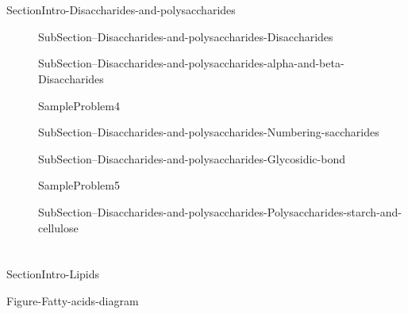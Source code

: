 \documentclass[main.tex]{subfiles}
\begin{document}
\section{\color{blue!30!black}{Disaccharides and polysaccharides}}
  {SectionIntro-Disaccharides-and-polysaccharides}



\sloppy\begin{description}

\item[] {SubSection--Disaccharides-and-polysaccharides-Disaccharides}


\item[] {SubSection--Disaccharides-and-polysaccharides-alpha-and-beta-Disaccharides}




  {SampleProblem4}



\item[] {SubSection--Disaccharides-and-polysaccharides-Numbering-saccharides}




\item[] {SubSection--Disaccharides-and-polysaccharides-Glycosidic-bond}




  {SampleProblem5}



\item[] 
{SubSection--Disaccharides-and-polysaccharides-Polysaccharides-starch-and-cellulose}





\end{description}

\section{\color{blue!30!black}{Lipids}}
{SectionIntro-Lipids}



  {Figure-Fatty-acids-diagram}
\end{document}
